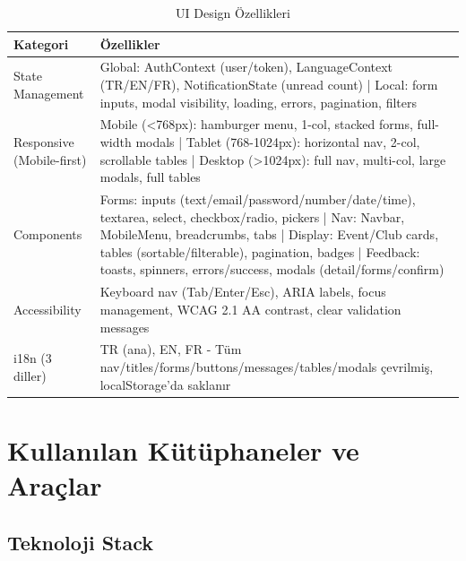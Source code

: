 \documentclass[a4paper,12pt]{report}
\begin{document}
\begin{table}[h]
\centering
\scriptsize
\begin{tabular}{|l|p{10.5cm}|}
\hline
\textbf{Kategori} & \textbf{Özellikler} \\ \hline
State Management & Global: AuthContext (user/token), LanguageContext (TR/EN/FR), NotificationState (unread count) | Local: form inputs, modal visibility, loading, errors, pagination, filters \\ \hline
Responsive (Mobile-first) & Mobile (<768px): hamburger menu, 1-col, stacked forms, full-width modals | Tablet (768-1024px): horizontal nav, 2-col, scrollable tables | Desktop (>1024px): full nav, multi-col, large modals, full tables \\ \hline
Components & Forms: inputs (text/email/password/number/date/time), textarea, select, checkbox/radio, pickers | Nav: Navbar, MobileMenu, breadcrumbs, tabs | Display: Event/Club cards, tables (sortable/filterable), pagination, badges | Feedback: toasts, spinners, errors/success, modals (detail/forms/confirm) \\ \hline
Accessibility & Keyboard nav (Tab/Enter/Esc), ARIA labels, focus management, WCAG 2.1 AA contrast, clear validation messages \\ \hline
i18n (3 diller) & TR (ana), EN, FR - Tüm nav/titles/forms/buttons/messages/tables/modals çevrilmiş, localStorage'da saklanır \\ \hline
\end{tabular}
\caption{UI Design Özellikleri}
\end{table}

\section{Kullanılan Kütüphaneler ve Araçlar}

\subsection{Teknoloji Stack}
\end{document}
